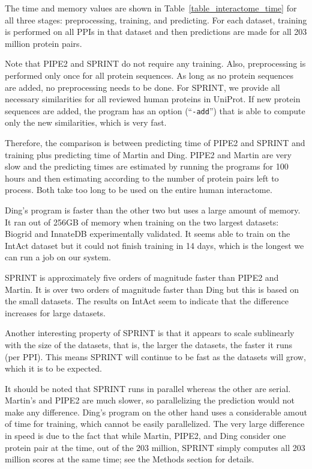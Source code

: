 The time and memory values are shown in Table~\ref{table_interactome_time} for all three stages: preprocessing, training, and predicting. For each dataset, training is performed on all PPIs in that dataset and then predictions are made for all 203 million protein pairs. 

Note that PIPE2 and SPRINT do not require any training. Also, preprocessing is performed only once for all protein sequences. As long as no protein sequences are added, no preprocessing needs to be done. For SPRINT, we provide all necessary similarities for all reviewed human proteins in UniProt. If new protein sequences are added, the program has an option (``\texttt{-add}'') that is able to compute only the new similarities, which is very fast.

Therefore, the comparison is between predicting time of PIPE2 and SPRINT and training plus predicting time of Martin and Ding. PIPE2 and Martin are very slow and the predicting times are estimated by running the programs for 100 hours and then estimating according to the number of protein pairs left to process. Both take too long to be used on the entire human interactome.

Ding's program is faster than the other two but uses a large amount of memory. It ran out of 256GB of memory when training on the two largest datasets: Biogrid and InnateDB experimentally validated. It seems able to train on the IntAct dataset but it could not finish training in 14 days, which is the longest we can run a job on our system.

SPRINT is approximately five orders of magnitude faster than PIPE2 and Martin. It is over two orders of magnitude faster than Ding but this is based on the small datasets. The results on IntAct seem to indicate that the difference increases for large datasets. 

Another interesting property of SPRINT is that it appears to scale sublinearly with the size of the datasets, that is, the larger the datasets, the faster it runs (per PPI). This means SPRINT will continue to be fast as the datasets will grow, which it is to be expected.

It should be noted that SPRINT runs in parallel whereas the other are serial. Martin's and PIPE2 are much slower, so parallelizing the prediction would not make any difference. Ding's program on the other hand uses a considerable amout of time for training, which cannot be easily parallelized. The very large difference in speed is due to the fact that while Martin, PIPE2, and Ding consider one protein pair at the time, out of the 203 million, SPRINT simply computes all 203 million scores at the same time; see the Methods section for details.

